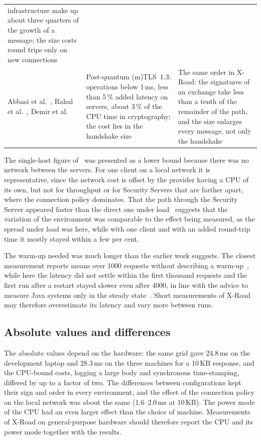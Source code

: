 \documentclass[conference,a4paper]{IEEEtran}
\newcommand{\newtext}[1]{{\color{blue}#1}}
\begin{document}
\begin{table}[!b]
\begin{tabular}{@{}p{}p{}p{}@{}}
infrastructure make up about three quarters of the growth of a message; the size costs round trips
only on new connections \\
\addlinespace
Abbasi et al.~\cite{abbasi2025}, Rahul et al.~\cite{rahul2026}, Demir et al.~\cite{demir2026} &
Post-quantum (m)TLS~1.3: operations below 1\,ms, less than 5\,\% added latency on servers, about
3\,\% of the CPU time in cryptography; the cost lies in the handshake size & The same order in
X-Road: the signatures of an exchange take less than a tenth of the remainder of the path, and the
size enlarges every message, not only the handshake \\
\bottomrule
\end{tabular}
\end{table}


\newtext{The single-host figure of~\cite{bakhtina2026ijis} was presented as a lower bound because
there was no network between the servers. For one client on a local network it is representative,
since the network cost is offset by the provider having a CPU of its own, but not for throughput or
for Security Servers that are farther apart, where the connection policy dominates. That the path
through the Security Server appeared faster than the direct one under load~\cite{taklai2020}
suggests that the variation of the environment was comparable to the effect being measured, as the
spread under load was here, while with one client and with an added round-trip time it mostly stayed
within a few per cent.}

The warm-up needed was much longer than the earlier work suggests. The closest measurement reports
means over 1000 requests without describing a warm-up~\cite{bakhtina2026ijis}, while here the latency did not settle
within the first thousand requests and the first run after a restart stayed slower even after 4000, in line with
the advice to measure Java systems only in the steady state~\cite{georges2007}. Short measurements of
X-Road may therefore overestimate its latency and vary more between runs.

\subsection{Absolute values and differences}

The absolute values depend on the hardware: the same grid gave 24.8\,ms on the development laptop and
28.3\,ms on the three machines for a 10\,KB response, and the CPU-bound costs, logging a large body
and synchronous time-stamping, differed by up to a factor of two. The differences between
configurations kept their sign and order in every environment, and the effect of the connection
policy on the local network was about the same (1.6--2.0\,ms at 10\,KB). The power mode of the CPU had an
even larger effect than the choice of machine. Measurements of X-Road on general-purpose hardware
should therefore report the CPU and its power mode together with the results.
\end{document}
